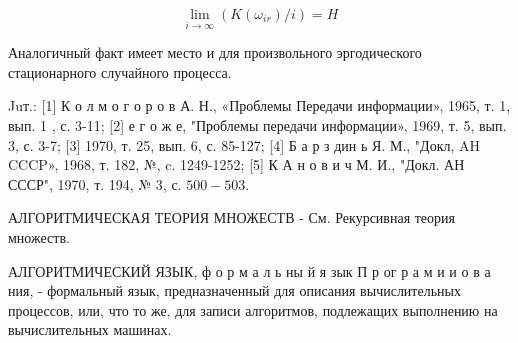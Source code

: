 \documentclass[10pt]{article}
\begin{document}
\[

\lim _{i \rightarrow \infty}\left(K\left(\omega_{i r}\right) / i\right)=H

\]



Аналогичный факт имеет место и для произвольного эргодического стационарного случайного процесса.



Juт.: [1] К о л м о г о р о в А. Н., «Проблемы Передачи информации», 1965, т. 1, вып. 1 , с. 3-11; [2] е г о ж е, "Проблемы передачи информации», 1969, т. 5, вып. 3, с. 3-7; [3] 1970, т. 25, вып. 6, с. 85-127; [4] Б а р з дин ь Я. М., "Докл, AH CCCP», 1968, т. 182, №, c. 1249-1252; [5] К А н о в и ч М. И., "Докл. АН СССР", 1970, т. 194, № 3, с. $500-503$.



АЛГОРИТМИЧЕСКАЯ ТЕОРИЯ МНОЖЕСТВ - См. Рекурсивная теория множеств.



АЛГОРИТМИЧЕСКИЙ ЯЗЫК, ф о р м а л ь ны й я зык П р ог р а м и и о в а ния, - формальный язык, предназначенный для описания вычислительных процессов, или, что то же, для записи алгоритмов, подлежащих выполнению на вычислительных машинах.
\end{document}
